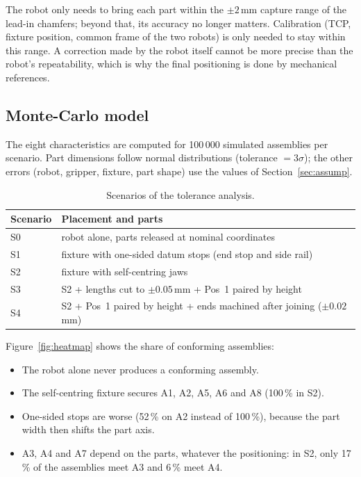 \documentclass[11pt,a4paper]{article}
\begin{document}
The robot only needs to bring each part within the $\pm2$\,mm capture range of the lead-in
chamfers; beyond that, its accuracy no longer matters. Calibration (TCP, fixture position, common
frame of the two robots) is only needed to stay within this range. A correction made by the robot
itself cannot be more precise than the robot's repeatability, which is why the final positioning is
done by mechanical references.

\subsection{Monte-Carlo model}

The eight characteristics are computed for 100\,000 simulated assemblies per scenario. Part
dimensions follow normal distributions (tolerance $=3\sigma$); the other errors (robot, gripper,
fixture, part shape) use the values of Section~\ref{sec:assump}.

\begin{table}[H]
\centering
\caption{Scenarios of the tolerance analysis.}
\begin{tabularx}{\textwidth}{@{}l L@{}}
\toprule
Scenario & Placement and parts\\
\midrule
S0 & robot alone, parts released at nominal coordinates\\
S1 & fixture with one-sided datum stops (end stop and side rail)\\
S2 & fixture with self-centring jaws\\
S3 & S2 + lengths cut to $\pm0.05$\,mm + Pos~1 paired by height\\
S4 & S2 + Pos~1 paired by height + ends machined after joining ($\pm0.02$\,mm)\\
\bottomrule
\end{tabularx}
\end{table}

Figure~\ref{fig:heatmap} shows the share of conforming assemblies:
\begin{itemize}
  \item The robot alone never produces a conforming assembly.
  \item The self-centring fixture secures A1, A2, A5, A6 and A8 (100\,\% in S2).
  \item One-sided stops are worse (52\,\% on A2 instead of 100\,\%), because the part width then
        shifts the part axis.
  \item A3, A4 and A7 depend on the parts, whatever the positioning: in S2, only 17\,\% of the
        assemblies meet A3 and 6\,\% meet A4.
\end{itemize}
\end{document}
